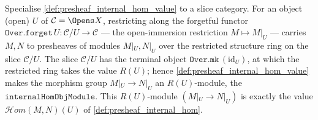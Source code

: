 \begin{definition}

  \label{def:presheaf_internal_hom_slice_value}
  Specialise \cref{def:presheaf_internal_hom_value} to a slice category. For an object
  (open) \(U\) of \(\mathcal{C} = \Opens X\), restricting along the forgetful functor
  \(\mathtt{Over.forget}\,U : \mathcal{C}/U \to \mathcal{C}\) --- the open-immersion
  restriction \(M \mapsto M|_U\) --- carries \(M, N\) to presheaves of modules
  \(M|_U, N|_U\) over the restricted structure ring on the slice \(\mathcal{C}/U\). The
  slice \(\mathcal{C}/U\) has the terminal object \(\mathtt{Over.mk}\,(\mathrm{id}_U)\),
  at which the restricted ring takes the value \(R(U)\); hence
  \cref{def:presheaf_internal_hom_value} makes the morphism group
  \(M|_U \longrightarrow N|_U\) an \(R(U)\)-module, the
  \(\mathtt{internalHomObjModule}\). This \(R(U)\)-module \((M|_U \to N|_U)\) is exactly
  the value \(\mathcal{H}om(M, N)(U)\) of \cref{def:presheaf_internal_hom}.
\end{definition}

